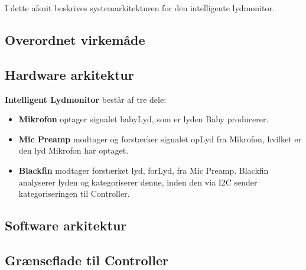 
I dette afsnit beskrives systemarkitekturen for den intelligente lydmonitor.

\subsection*{Overordnet virkemåde}

\subsection*{Hardware arkitektur}

\textbf{Intelligent Lydmonitor} består af tre dele: 
\begin{itemize}
\item \textbf{Mikrofon} optager signalet babyLyd, som er lyden Baby producerer. 
\item \textbf{Mic Preamp} modtager og forstærker signalet opLyd fra Mikrofon, hvilket er den lyd Mikrofon har optaget. 
\item \textbf{Blackfin} modtager forstærket lyd, forLyd, fra Mic Preamp. Blackfin analyserer lyden og kategoriserer denne, inden den via I2C sender kategoriseringen til Controller. 
\end{itemize}





\subsection*{Software arkitektur}

\subsection*{Grænseflade til Controller}


